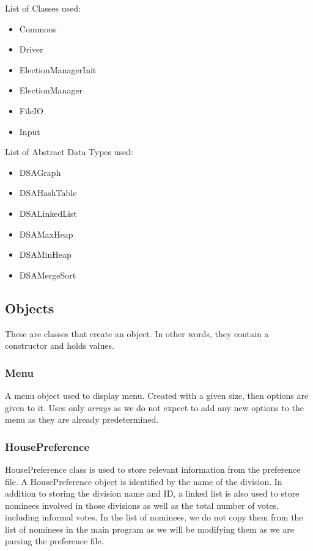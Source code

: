 \documentclass[a4paper, 12pt, titlepage]{article}
\begin{document}
List of Classes used:
\begin{itemize}[label={--}]
    \item Commons
    \item Driver
    \item ElectionManagerInit
    \item ElectionManager
    \item FileIO
    \item Input
\end{itemize}

List of Abstract Data Types used:
\begin{itemize}[label={--}]
    \item DSAGraph
    \item DSAHashTable
    \item DSALinkedList
    \item DSAMaxHeap
    \item DSAMinHeap
    \item DSAMergeSort
\end{itemize}
\newpage

\subsection{Objects}

These are classes that create an object. In other words, they contain a
constructor and holds values.

\subsubsection{Menu}

A menu object used to display menu. Created with a given size, then
options are given to it. Uses only \textit{arrays} as we do not expect to add
any new options to the menu as they are already predetermined.

\subsubsection{HousePreference}

HousePreference class is used to store relevant information from the
preference file. A HousePreference object is identified by the name
of the division. In addition to storing the division name and ID,
a linked list is also used to store nominees involved in those divisions
as well as the total number of votes, including informal votes. In the list
of nominees, we do not copy them from the list of nominees in the main program
as we will be modifying them as we are parsing the preference file.
\end{document}
